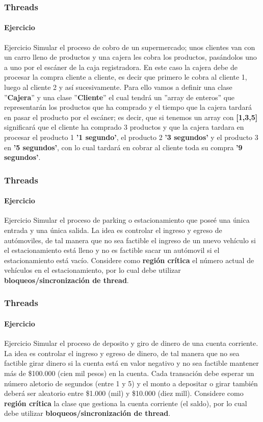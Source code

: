 \documentclass{beamer}
\begin{document}
    \begin{frame}
		\frametitle{Threads}
		\framesubtitle{Ejercicio}

        \begin{exampleblock}{Ejercicio} 
            {\scriptsize
            Simular el proceso de cobro de un supermercado; unos clientes van con un carro lleno de productos y una cajera les cobra los productos, pas\'andolos uno a uno por el esc\'aner de la caja registradora. En este caso la cajera debe de procesar la compra cliente a cliente, es decir que primero le cobra al cliente 1, luego al cliente 2 y as\'i sucesivamente. Para ello vamos a definir una clase ''\textbf{Cajera}'' y una clase ''\textbf{Cliente}'' el cual tendr\'a un ''array de enteros'' que representar\'an los productos que ha comprado y el tiempo que la cajera tardar\'a en pasar el producto por el esc\'aner; es decir, que si tenemos un array con \textbf{[1,3,5]} significar\'a que el cliente ha comprado 3 productos y que la cajera tardara en procesar el producto 1 \textbf{'1 segundo'}, el producto 2 \textbf{'3 segundos'} y el producto 3 en \textbf{'5 segundos'}, con lo cual tardar\'a en cobrar al cliente toda su compra \textbf{'9 segundos'}.
            }
        \end{exampleblock}
	\end{frame}	

    \begin{frame}
		\frametitle{Threads}
		\framesubtitle{Ejercicio}

        \begin{exampleblock}{Ejercicio} 
            {\scriptsize
            Simular el proceso de parking o estacionamiento que pose\'e una \'unica entrada y una \'unica salida. La idea es controlar el ingreso y egreso de aut\'omoviles, de tal manera que no sea factible el ingreso de un nuevo veh\'iculo si el estacionamiento est\'a lleno y no es factible sacar un aut\'omovil si el estacionamiento est\'a vac\'io. Considere como \textbf{regi\'on cr\'itica} el n\'umero actual de veh\'iculos en el estacionamiento, por lo cual debe utilizar \textbf{bloqueos/sincronizaci\'on de thread}.
            }
        \end{exampleblock}
	\end{frame}	
	
	\begin{frame}
		\frametitle{Threads}
		\framesubtitle{Ejercicio}

        \begin{exampleblock}{Ejercicio} 
            {\scriptsize
            Simular el proceso de deposito y giro de dinero de una cuenta corriente. La idea es controlar el ingreso y egreso de dinero, de tal manera que no sea factible girar dinero si la cuenta est\'a en valor negativo y no sea factible mantener m\'as de \$100.000 (cien mil pesos) en la cuenta. Cada transaci\'on debe esperar un n\'umero aletorio de segundos (entre 1 y 5) y el monto a depositar o girar tambi\'en deber\'a ser aleatorio entre \$1.000 (mil) y \$10.000 (diez mill). Considere como \textbf{regi\'on cr\'itica} la clase que gestiona la cuenta corriente (el saldo), por lo cual debe utilizar \textbf{bloqueos/sincronizaci\'on de thread}.
            }
        \end{exampleblock}
	\end{frame}		
\end{document}
